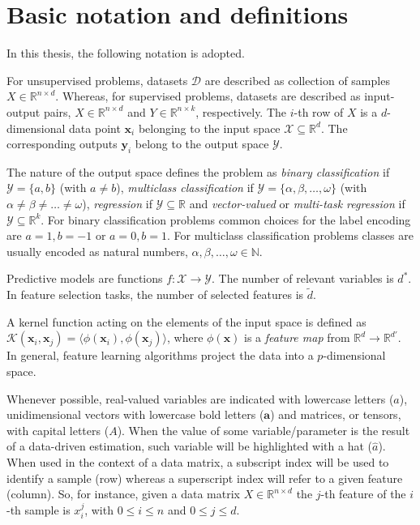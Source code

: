 \chapter{Basic notation and definitions} \label{sec:notation}
In this thesis, the following notation is adopted.

For unsupervised problems, datasets $\mathcal{D}$ are described as collection of samples $X \in \mathbb{R}^{n \times d}$. Whereas, for supervised problems, datasets are described as input-output pairs, $X \in \mathbb{R}^{n \times d}$ and $Y \in \mathbb{R}^{n \times k}$, respectively.
The $i$-th row of $X$ is a $d$-dimensional data point $\bm{x}_{i}$ belonging to the input space $\mathcal{X}\subseteq\mathds{R}^d$. The corresponding outputs $\bm{y}_{i}$ belong to the output space $\mathcal{Y}$.

The nature of the output space defines the problem as \textit{binary classification} if  $\mathcal{Y} = \{a,b\}$ (with $a\neq b$), \textit{multiclass classification} if
$\mathcal{Y} = \{\alpha,\beta,\dots,\omega\}$
(with $\alpha \neq \beta \neq \dots \neq \omega$),
\textit{regression} if $\mathcal{Y}\subseteq\mathds{R}$ and
\textit{vector-valued} or \textit{multi-task regression} if $\mathcal{Y}\subseteq\mathds{R}^k$.
For binary classification problems common choices for the label encoding are $a=1, b=-1$ or $a=0, b=1$.
For multiclass classification problems classes are usually encoded as natural numbers, \ie $\alpha, \beta, \dots, \omega \in \mathbb{N}$.

Predictive models are functions $f: \mathcal{X} \rightarrow \mathcal{Y}$.
The number of relevant variables is $d^*$.
In feature selection tasks, the number of selected features is $\tilde d$.

A kernel function acting on the elements of the input space is defined as $\mathcal{K}(\bm{x}_{i},\bm{x}_{j})=\langle \phi(\bm{x}_{i}), \phi(\bm{x}_{j})\rangle$, where $\phi(\bm{x})$ is a {\em feature map} from $\mathds{R}^d \rightarrow \mathds{R}^{d'}$.
In general, feature learning algorithms project the data into a $p$-dimensional space.

Whenever possible,
real-valued variables are indicated with lowercase letters (\eg $a$),
unidimensional vectors with lowercase bold letters (\eg $\bm{a}$) and
matrices, or tensors, with capital letters (\eg $A$).
When the value of some variable/parameter is the result of a data-driven estimation, such variable will be highlighted with a hat (\eg $\hat a$).
When used in the context of a data matrix, a subscript index will be used to identify a sample (row) whereas a superscript index will refer to a given feature (column).
So, for instance, given a data matrix $X \in \mathbb{R}^{n \times d}$ the $j$-th feature of the $i$-th sample is $x_i^j$, with $0 \leq i \leq n$ and $0\leq j\leq d$.
